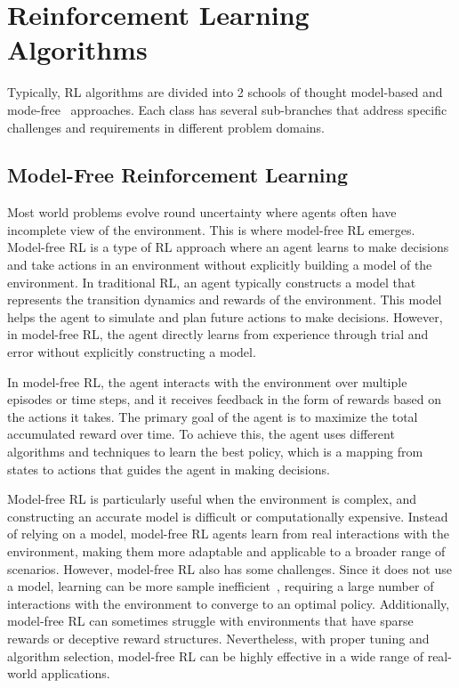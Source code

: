 \section{Reinforcement Learning Algorithms}\label{sec:reinforcement-learning-algorithms}

Typically, RL algorithms are divided into 2
schools of thought \textemdash model-based and mode-free~\cite{sutton2018reinforcement} approaches.
Each class has several sub-branches that address specific challenges and requirements in different problem domains.

\subsection{Model-Free Reinforcement Learning}\label{subsec:model-free-reinforcement-learning}
Most world problems evolve round uncertainty where agents often have incomplete view of the environment.
This is where model-free RL emerges.
Model-free RL is a type of RL approach where an agent learns to make decisions and take actions in an environment without explicitly building a model of the environment. In traditional RL, an agent typically constructs a model that represents the transition dynamics and rewards of the environment. This model helps the agent to simulate and plan future actions to make decisions. However, in model-free RL, the agent directly learns from experience through trial and error without explicitly constructing a model.

In model-free RL, the agent interacts with the environment over multiple episodes or time steps, and it receives feedback in the form of rewards based on the actions it takes. The primary goal of the agent is to maximize the total accumulated reward over time. To achieve this, the agent uses different algorithms and techniques to learn the best policy, which is a mapping from states to actions that guides the agent in making decisions.

Model-free RL is particularly useful when the environment is complex, and constructing an accurate model is difficult or computationally expensive.
Instead of relying on a model, model-free RL agents learn from real interactions with the environment, making them more adaptable and applicable to a broader range of scenarios.
However, model-free RL also has some challenges.
Since it does not use a model, learning can be more sample inefficient~\cite{sutton2018reinforcement}, requiring a large number of interactions with the environment to converge to an optimal policy. Additionally, model-free RL can sometimes struggle with environments that have sparse rewards or deceptive reward structures. Nevertheless, with proper tuning and algorithm selection, model-free RL can be highly effective in a wide range of real-world applications.
